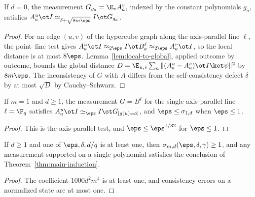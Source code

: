 \begin{lemma}\label{lem:main-induction-degree-zero}
	\leanok
	If $d=0$, the measurement $G_{g_a}=\E_vA^v_a$, indexed by the constant
	polynomials $g_a$, satisfies
	$A^u_a\ot I\simeq_{\delta+\sqrt{8m\eps}}I\ot G_{g_a}$.
\end{lemma}
\begin{proof}
	\leanok
	For an edge $(u,v)$ of the hypercube graph along the axis-parallel line
	$\ell$, the point--line test gives
	$A^u_a\ot I\approx_{2\eps}I\ot B^\ell_a\approx_{2\eps}A^v_a\ot I$, so the
	local distance is at most $8\eps$.  Lemma~\ref{lem:local-to-global},
	applied outcome by outcome, bounds the global distance
	$D=\E_{u,v}\sum_a\|(A^u_a-A^v_a)\ot I\ket\psi\|^2$ by $8m\eps$.  The
	inconsistency of $G$ with $A$ differs from the self-consistency defect
	$\delta$ by at most $\sqrt D$ by Cauchy--Schwarz.
\end{proof}

\begin{lemma}\label{lem:main-induction-dimension-one}
	\leanok
	If $m=1$ and $d\ge1$, the measurement $G=B^\ell$ for the single
	axis-parallel line $\ell=\F_q$ satisfies
	$A^u_a\ot I\simeq_\eps I\ot G_{[g(u)=a]}$, and $\eps\le\sigma_{1,d}$ when
	$\eps\le1$.
\end{lemma}
\begin{proof}
	\leanok
	This is the axis-parallel test, and $\eps\le\eps^{1/32}$ for $\eps\le1$.
\end{proof}

\begin{lemma}\label{lem:main-induction-large-error}
	\leanok
	If $d\ge1$ and one of $\eps,\delta,d/q$ is at least one, then
	$\sigma_{m,d}(\eps,\delta,\gamma)\ge1$, and any measurement supported on a
	single polynomial satisfies the conclusion of
	Theorem~\ref{thm:main-induction}.
\end{lemma}
\begin{proof}
	\leanok
	The coefficient $1000d^2m^4$ is at least one, and consistency errors on a
	normalized state are at most one.
\end{proof}


